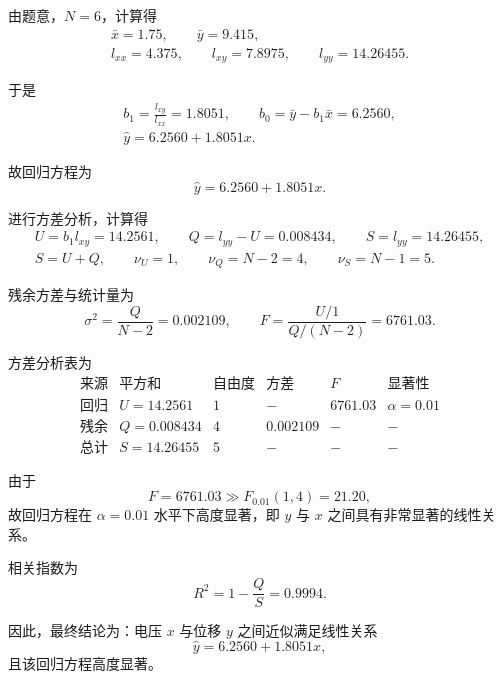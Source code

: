 \documentclass[UTF8,zihao=-4]{ctexart}
\begin{document}
{由题意，$N=6$，计算得
\begin{equation*}
\begin{gathered}
    \bar{x}=1.75,\qquad \bar{y}=9.415,\\
    l_{xx}=4.375,\qquad l_{xy}=7.8975,\qquad l_{yy}=14.26455 .
\end{gathered}
\end{equation*}

于是
\begin{equation*}
\begin{gathered}
    b_1=\frac{l_{xy}}{l_{xx}}=1.8051,\qquad
    b_0=\bar{y}-b_1\bar{x}=6.2560,\\
    \hat{y}=6.2560+1.8051x .
\end{gathered}
\end{equation*}

故回归方程为
\begin{equation*}
    \boxed{\hat{y}=6.2560+1.8051x}.
\end{equation*}

进行方差分析，计算得
\begin{equation*}
\begin{gathered}
    U=b_1l_{xy}=14.2561,\qquad
    Q=l_{yy}-U=0.008434,\qquad
    S=l_{yy}=14.26455,\\
    S=U+Q,\qquad
    \nu_U=1,\qquad \nu_Q=N-2=4,\qquad \nu_S=N-1=5 .
\end{gathered}
\end{equation*}

残余方差与统计量为
\begin{equation*}
    \sigma^2=\frac{Q}{N-2}=0.002109,\qquad
    F=\frac{U/1}{Q/(N-2)}=6761.03 .
\end{equation*}

方差分析表为
\begin{equation*}
\begin{array}{c|c|c|c|c|c}
\text{来源} & \text{平方和} & \text{自由度} & \text{方差} & F & \text{显著性} \\
\text{回归} & U=14.2561 & 1 & - & 6761.03 & \alpha=0.01 \\
\text{残余} & Q=0.008434 & 4 & 0.002109 & - & - \\
\text{总计} & S=14.26455 & 5 & - & - & -
\end{array}
\end{equation*}

由于
\begin{equation*}
    F=6761.03\gg F_{0.01}(1,4)=21.20,
\end{equation*}
故回归方程在 $\alpha=0.01$ 水平下高度显著，即 $y$ 与 $x$ 之间具有非常显著的线性关系。

相关指数为
\begin{equation*}
    R^2=1-\frac{Q}{S}=0.9994 .
\end{equation*}

因此，最终结论为：电压 $x$ 与位移 $y$ 之间近似满足线性关系
\begin{equation*}
    \boxed{\hat{y}=6.2560+1.8051x},
\end{equation*}
且该回归方程高度显著。

}
\end{document}
